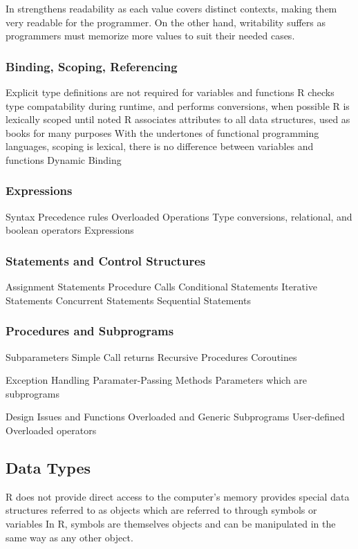 \documentclass[12pt]{article}
\begin{document}
In strengthens readability as each value covers distinct contexts, making them very readable for the programmer. On the other hand, writability suffers as programmers must memorize more values to suit their needed cases.

\subsubsection{Binding, Scoping, Referencing}
  Explicit type definitions are not required for variables and functions
  R checks type compatability during runtime, and performs conversions, when possible
  R is lexically scoped until noted
  R associates attributes to all data structures, used as books for many purposes
  With the undertones of functional programming languages, scoping is lexical, there is no difference between variables and functions
  Dynamic Binding

\subsubsection{Expressions}
Syntax
Precedence rules
Overloaded Operations
Type conversions, relational, and boolean operators
Expressions

\subsubsection{Statements and Control Structures}
Assignment Statements
Procedure Calls
Conditional Statements
Iterative Statements
Concurrent Statements
Sequential Statements

\subsubsection{Procedures and Subprograms}
Subparameters
Simple Call returns
Recursive Procedures
Coroutines

Exception Handling
Paramater-Passing Methods
Parameters which are subprograms

Design Issues and Functions
Overloaded and Generic Subprograms
User-defined Overloaded operators


\iffalse
\subsection{Data Types}
R does not provide direct access to the computer's memory
provides special data structures referred to as objects
which are referred to through symbols or variables
In R, symbols are themselves objects and can be manipulated in the same way as any other object.
\end{document}
